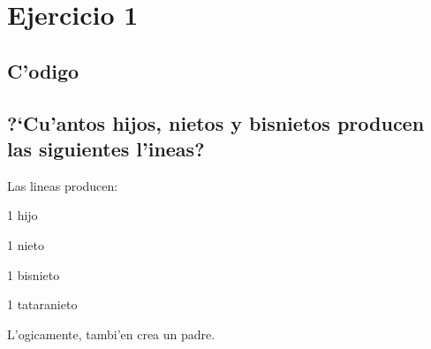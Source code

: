 \documentclass[a4paper,10pt]{article}
\newcommand{\?}{?`}
\begin{document}

\setcounter{page}{1}
\tableofcontents
\newpage
\setcounter{page}{1}

\section{Ejercicio 1}

\subsection{C'odigo}

\subsection[Punto A]{\?Cu'antos hijos, nietos y bisnietos producen las siguientes l'ineas?}
Las lineas producen:
\begin{description}
 \item 1 hijo
 \item 1 nieto
 \item 1 bisnieto
 \item 1 tataranieto
\end{description}

L'ogicamente, tambi'en crea un padre.
\end{document}
